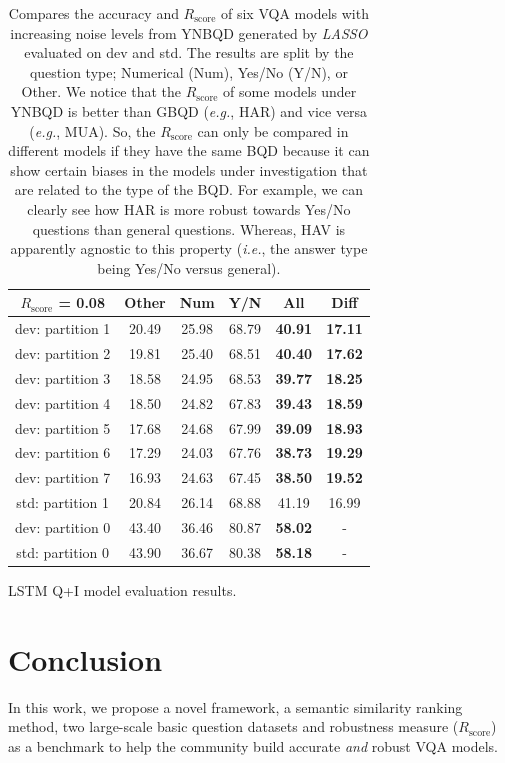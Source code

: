 \documentclass[letterpaper]{article}
\newcommand{\ie}{}\def\ie/{{\em i.e.}}
\newcommand{\eg}{}\def\eg/{{\em e.g.}}
\newcommand{\lasso}{}\def\lasso/{\textit{LASSO}}
\newcommand{\rscore}{}\def\rscore/{$R_{\text{score}}$}
\begin{document}
\begin{table}
\begin{subtable}{0.49\linewidth}
		\begin{tabular}{c | c c c c | c}
			\rscore/ = 0.08  & Other & Num   & Y/N   & All            & Diff           \\ [0.5ex]
			\hline
			dev: partition 1 & 20.49 & 25.98 & 68.79 & \textbf{40.91} & \textbf{17.11} \\
			dev: partition 2 & 19.81 & 25.40 & 68.51 & \textbf{40.40} & \textbf{17.62} \\
			dev: partition 3 & 18.58 & 24.95 & 68.53 & \textbf{39.77} & \textbf{18.25} \\
			dev: partition 4 & 18.50 & 24.82 & 67.83 & \textbf{39.43} & \textbf{18.59} \\
			dev: partition 5 & 17.68 & 24.68 & 67.99 & \textbf{39.09} & \textbf{18.93} \\
			dev: partition 6 & 17.29 & 24.03 & 67.76 & \textbf{38.73} & \textbf{19.29} \\
			dev: partition 7 & 16.93 & 24.63 & 67.45 & \textbf{38.50} & \textbf{19.52} \\
			\hline
			std: partition 1 & 20.84 & 26.14 & 68.88 & 41.19          & 16.99          \\
			\hline
			dev: partition 0 & 43.40 & 36.46 & 80.87 & \textbf{58.02} & -              \\
			std: partition 0 & 43.90 & 36.67 & 80.38 & \textbf{58.18} & -              \\
			\hline
		\end{tabular}
		\caption{LSTM Q+I model evaluation results.}
	\end{subtable}
	\caption{Compares the accuracy and \rscore/ of six VQA models with increasing noise levels from YNBQD generated by \lasso/ evaluated on dev and std. The results are split by the question type; Numerical (Num), Yes/No (Y/N), or Other. We notice that the \rscore/ of some models under YNBQD is better than GBQD (\eg/, HAR) and vice versa (\eg/, MUA). So, the \rscore/ can only be compared in different models if they have the same BQD because it can show certain biases in the models under investigation that are related to the type of the BQD. For example, we can clearly see how HAR is more robust towards Yes/No questions than general questions. Whereas, HAV is apparently agnostic to this property (\ie/, the answer type being Yes/No versus general).}
	\label{tbl:lasso_ynbqd}
\end{table}

\section{Conclusion}
In this work, we propose a novel framework, a semantic similarity ranking method, two large-scale basic question datasets and robustness measure (\rscore/) as a benchmark to help the community build accurate \emph{and} robust VQA models.
\end{document}
